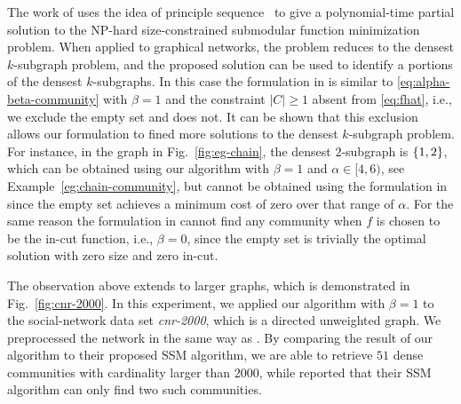The work of \cite{nagano2011size} uses the idea of principle
sequence~\cite{fujishige80,fujishige05,fujishige-pp-revisited} to give a polynomial-time partial
solution to the NP-hard size-constrained submodular function minimization problem. When applied to
graphical networks, the problem reduces to the densest $k$-subgraph problem, and the proposed
solution can be used to identify a portions of the densest $k$-subgraphs.
%
In this case the formulation  in \cite{nagano2011size} is similar to 
\eqref{eq:alpha-beta-community} 
with $\beta = 1$ and the constraint $|C| \geq 1$
absent from \eqref{eq:fhat}, i.e., we exclude the empty
set and \cite{nagano2011size} does not.
It can be shown that this exclusion allows our formulation to fined more solutions to the densest
$k$-subgraph problem. For instance, 
in the graph in Fig.~\ref{fig:eg-chain}, the densest $2$-subgraph is $\{1,2\}$, which can be
obtained using our algorithm with $\beta = 1$ and $\alpha \in [4,6)$, see
Example~\ref{eg:chain-community}, but cannot be obtained using the formulation in
\cite{nagano2011size} since the empty set achieves a minimum cost of zero over that range of
$\alpha$.
For the same reason the formulation in \cite{nagano2011size} cannot find any community when
$f$ is chosen to be the in-cut function, i.e., $\beta = 0$, since the empty set is trivially the
optimal solution with zero size and zero in-cut.


The observation above extends to larger graphs, which is demonstrated in Fig.~\ref{fig:cnr-2000}.
In this experiment, we applied our algorithm with $\beta = 1$ to the social-network data set
\emph{cnr-2000}, which is a directed unweighted graph. We preprocessed the network in the same way
as \cite{nagano2011size}.
By comparing the result of our algorithm to their proposed SSM algorithm, we are able to retrieve
$51$ dense communities with cardinality larger than $2000$, while \cite{nagano2011size} reported that their SSM algorithm can only find
two such communities.

